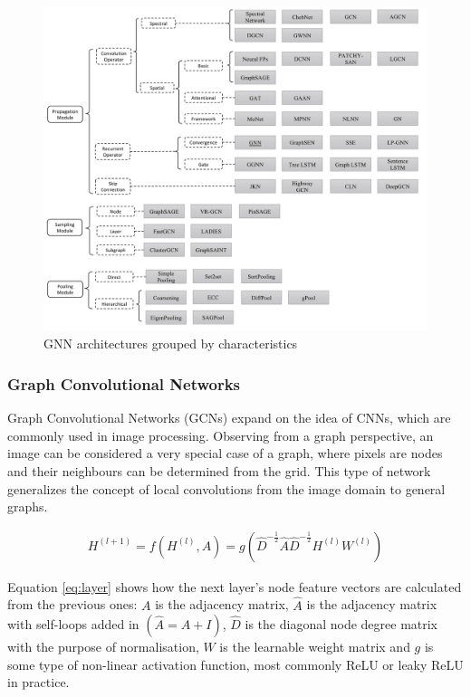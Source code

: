 	 \begin{figure}[!h]
	 	\centering
	 	\includegraphics[width=\textwidth]{figures/gnn_types.jpg}
	 	\caption{GNN architectures grouped by characteristics\cite{gnn_review}}
	 \end{figure}
	
	\subsubsection{Graph Convolutional Networks}
	
	Graph Convolutional Networks\cite{kipf2016semi} (GCNs) expand on the idea of CNNs, which are commonly used in image processing. Observing from a graph perspective, an image can be considered a very special case of a graph, where pixels are nodes and their neighbours can be determined from the grid. This type of network generalizes the concept of local convolutions from the image domain to general graphs.
	
	\begin{align}
		H^{(l+1)} = f\left(H^{(l)}, A\right) = g\left(\hat{D}^{- \frac{1}{2}} \hat{A} \hat{D}^{- \frac{1}{2}} H^{(l)} W^{(l)}\right)
		\label{eq:layer}
	\end{align}
	
	Equation \ref{eq:layer} shows how the next layer's node feature vectors are calculated from the previous ones: $A$ is the adjacency matrix, $\hat{A}$ is the adjacency matrix with self-loops added in $(\hat{A} = A + I)$, $\hat{D}$ is the diagonal node degree matrix with the purpose of normalisation, $W$ is the learnable weight matrix and $g$ is some type of non-linear activation function, most commonly ReLU or leaky ReLU in practice.
	
